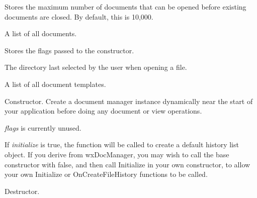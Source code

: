 \label{wxdocmanagermmaxdocsopen}


Stores the maximum number of documents that can be opened before
existing documents are closed. By default, this is 10,000.


\label{wxdocmanagermdocs}


A list of all documents.


\label{wxdocmanagermflags}


Stores the flags passed to the constructor.


\label{wxdocmanagermlastdirectory}

The directory last selected by the user when opening a file.



\label{wxdocmanagermtemplates}


A list of all document templates.


\label{wxdocmanagerctor}


Constructor. Create a document manager instance dynamically near the start of your application
before doing any document or view operations.

{\it flags} is currently unused.

If {\it initialize} is true, the  function will be called
to create a default history list object. If you derive from wxDocManager, you may wish to call the
base constructor with false, and then call Initialize in your own constructor, to allow
your own Initialize or OnCreateFileHistory functions to be called.


\label{wxdocmanagerdtor}


Destructor.


\label{wxdocmanageractivateview}


